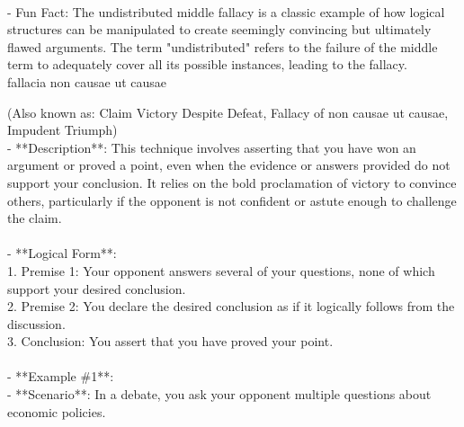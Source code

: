 \documentclass[a4paper,12pt,single,pdftex]{scrbook}
\begin{document}
    
      
    \\

    
      - Fun Fact: The undistributed middle fallacy is a classic example of how logical structures can be manipulated to create seemingly convincing but ultimately flawed arguments. The term "undistributed" refers to the failure of the middle term to adequately cover all its possible instances, leading to the fallacy.
    \\

  

fallacia non causae ut causae
    
      (Also known as: Claim Victory Despite Defeat, Fallacy of non causae ut causae, Impudent Triumph)
    \\

  
    
      - **Description**: This technique involves asserting that you have won an argument or proved a point, even when the evidence or answers provided do not support your conclusion. It relies on the bold proclamation of victory to convince others, particularly if the opponent is not confident or astute enough to challenge the claim.
    \\

    
      
    \\

    
      - **Logical Form**:
    \\

    
        1. Premise 1: Your opponent answers several of your questions, none of which support your desired conclusion.
    \\

    
        2. Premise 2: You declare the desired conclusion as if it logically follows from the discussion.
    \\

    
        3. Conclusion: You assert that you have proved your point.
    \\

    
      
    \\

    
      - **Example \#1**:
    \\

    
        - **Scenario**: In a debate, you ask your opponent multiple questions about economic policies.
    \\
\end{document}

